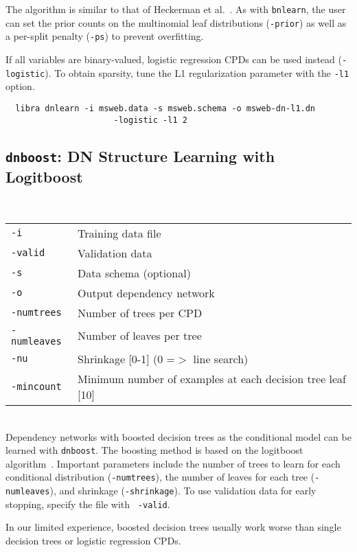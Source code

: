\documentclass[11pt]{article}
\begin{document}
The algorithm is similar to that of Heckerman et
al.~\cite{heckerman&al00}.  As with {\tt bnlearn}, the user can set
the prior counts on the multinomial leaf distributions ({\tt -prior})
as well as a per-split penalty ({\tt -ps}) to prevent overfitting.

If all variables are binary-valued, logistic regression CPDs can be
used instead ({\tt -logistic}).  To obtain sparsity, tune the L1
regularization parameter with the {\tt -l1} option.
\begin{verbatim}
  libra dnlearn -i msweb.data -s msweb.schema -o msweb-dn-l1.dn
        			  -logistic -l1 2
\end{verbatim}

\subsection{{\tt dnboost}: DN Structure Learning with Logitboost} \label{sec:dnboost}

\noindent {} \\
\begin{tabular}{ll}
{\tt -i} &          Training data file \\
{\tt -valid} &      Validation data \\
{\tt -s} &          Data schema (optional) \\
{\tt -o} &          Output dependency network \\
{\tt -numtrees} &   Number of trees per CPD \\
{\tt -numleaves} &  Number of leaves per tree \\
{\tt -nu} &         Shrinkage [0-1] (0 =$>$ line search) \\
{\tt -mincount} &   Minimum number of examples at each decision tree leaf [10] \\
\end{tabular} \\

Dependency networks with boosted decision trees as the conditional
model can be learned with {\tt dnboost}.  The boosting method is based
on the logitboost algorithm~\cite{friedman&al98}.  Important
parameters include the number of trees to learn for each conditional
distribution ({\tt -numtrees}), the number of leaves for each tree
({\tt -numleaves}), and shrinkage ({\tt -shrinkage}).  To use
validation data for early stopping, specify the file with {\tt
-valid}.

In our limited experience, boosted decision trees usually work worse
than single decision trees or logistic regression CPDs.
\end{document}
